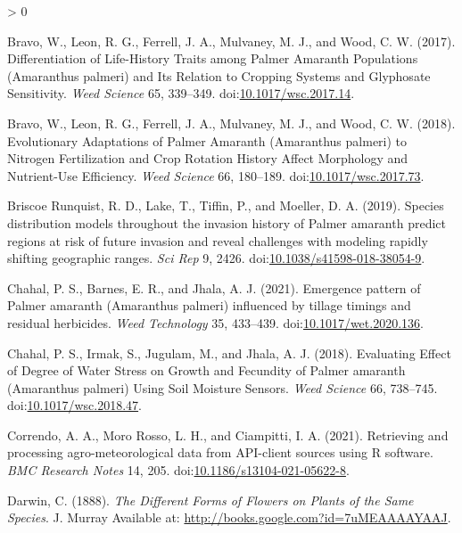 \documentclass[utf8]{frontiersSCNS}
\newlength{\cslhangindent}
\newenvironment{CSLReferences}[2] %
 {%
  \setlength{\parindent}{0pt}
  \ifodd #1 \everypar{\setlength{\hangindent}{\cslhangindent}}\ignorespaces\fi
  \ifnum #2 > 0
  \setlength{\parskip}{#2\baselineskip}
  \fi
 }%
 {}
\begin{document}
\begin{CSLReferences}{1}{0}
\leavevmode\hypertarget{ref-bravo2017}{}%
Bravo, W., Leon, R. G., Ferrell, J. A., Mulvaney, M. J., and Wood, C. W.
(2017). Differentiation of {Life}-{History Traits} among {Palmer
Amaranth Populations} ({Amaranthus} palmeri) and {Its Relation} to
{Cropping Systems} and {Glyphosate Sensitivity}. \emph{Weed Science} 65,
339--349.
doi:\href{https://doi.org/10.1017/wsc.2017.14}{10.1017/wsc.2017.14}.

\leavevmode\hypertarget{ref-bravo2018}{}%
Bravo, W., Leon, R. G., Ferrell, J. A., Mulvaney, M. J., and Wood, C. W.
(2018). Evolutionary {Adaptations} of {Palmer Amaranth} ({Amaranthus}
palmeri) to {Nitrogen Fertilization} and {Crop Rotation History Affect
Morphology} and {Nutrient}-{Use Efficiency}. \emph{Weed Science} 66,
180--189.
doi:\href{https://doi.org/10.1017/wsc.2017.73}{10.1017/wsc.2017.73}.

\leavevmode\hypertarget{ref-briscoerunquist2019}{}%
Briscoe Runquist, R. D., Lake, T., Tiffin, P., and Moeller, D. A.
(2019). Species distribution models throughout the invasion history of
{Palmer} amaranth predict regions at risk of future invasion and reveal
challenges with modeling rapidly shifting geographic ranges. \emph{Sci
Rep} 9, 2426.
doi:\href{https://doi.org/10.1038/s41598-018-38054-9}{10.1038/s41598-018-38054-9}.

\leavevmode\hypertarget{ref-chahal2021}{}%
Chahal, P. S., Barnes, E. R., and Jhala, A. J. (2021). Emergence pattern
of {Palmer} amaranth ({Amaranthus} palmeri) influenced by tillage
timings and residual herbicides. \emph{Weed Technology} 35, 433--439.
doi:\href{https://doi.org/10.1017/wet.2020.136}{10.1017/wet.2020.136}.

\leavevmode\hypertarget{ref-chahal2018}{}%
Chahal, P. S., Irmak, S., Jugulam, M., and Jhala, A. J. (2018).
Evaluating {Effect} of {Degree} of {Water Stress} on {Growth} and
{Fecundity} of {Palmer} amaranth ({Amaranthus} palmeri) {Using Soil
Moisture Sensors}. \emph{Weed Science} 66, 738--745.
doi:\href{https://doi.org/10.1017/wsc.2018.47}{10.1017/wsc.2018.47}.

\leavevmode\hypertarget{ref-correndo2021}{}%
Correndo, A. A., Moro Rosso, L. H., and Ciampitti, I. A. (2021).
Retrieving and processing agro-meteorological data from {API}-client
sources using {R} software. \emph{BMC Research Notes} 14, 205.
doi:\href{https://doi.org/10.1186/s13104-021-05622-8}{10.1186/s13104-021-05622-8}.

\leavevmode\hypertarget{ref-darwin1888}{}%
Darwin, C. (1888). \emph{The {Different Forms} of {Flowers} on {Plants}
of the {Same Species}}. {J. Murray} Available at:
\url{http://books.google.com?id=7uMEAAAAYAAJ}.


\end{CSLReferences}
\end{document}

